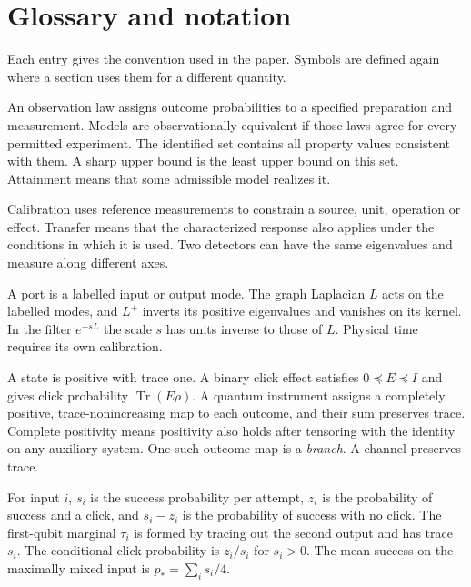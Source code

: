 \documentclass[11pt,letterpaper]{article}
\newcommand{\tr}{\operatorname{Tr}}\newcommand{\TV}{\operatorname{TV}}\newcommand{\E}{\mathbb E}\newcommand{\id}{\mathbb I}\newcommand{\calB}{\mathcal B}\newcommand{\norm}[1]{\left\lVert#1\right\rVert}
\begin{document}
\section*{Glossary and notation}\label{sec:glossary}
\noindent Each entry gives the convention used in the paper. Symbols are defined again where a section uses them for a different quantity.\small
\begin{description}[style=nextline,leftmargin=0pt,labelindent=0pt,itemsep=3pt,parsep=0pt]
\item[Observation law and identified set.] An observation law assigns outcome probabilities to a specified preparation and measurement. Models are observationally equivalent if those laws agree for every permitted experiment. The identified set contains all property values consistent with them. A sharp upper bound is the least upper bound on this set. Attainment means that some admissible model realizes it.
\item[Calibration and transfer.] Calibration uses reference measurements to constrain a source, unit, operation or effect. Transfer means that the characterized response also applies under the conditions in which it is used. Two detectors can have the same eigenvalues and measure along different axes.
\item[Port and spectral scale.] A port is a labelled input or output mode. The graph Laplacian $L$ acts on the labelled modes, and $L^+$ inverts its positive eigenvalues and vanishes on its kernel. In the filter $e^{-sL}$ the scale $s$ has units inverse to those of $L$. Physical time requires its own calibration.
\item[State, effect and instrument.] A state is positive with trace one. A binary click effect satisfies $0\preceq E\preceq I$ and gives click probability $\tr(E\rho)$. A quantum instrument assigns a completely positive, trace-nonincreasing map to each outcome, and their sum preserves trace. Complete positivity means positivity also holds after tensoring with the identity on any auxiliary system. One such outcome map is a \emph{branch}. A channel preserves trace.
\item[Success and marginal.] For input $i$, $s_i$ is the success probability per attempt, $z_i$ is the probability of success and a click, and $s_i-z_i$ is the probability of success with no click. The first-qubit marginal $\tau_i$ is formed by tracing out the second output and has trace $s_i$. The conditional click probability is $z_i/s_i$ for $s_i>0$. The mean success on the maximally mixed input is $p_*=\sum_i s_i/4$.

\end{description}
\end{document}
